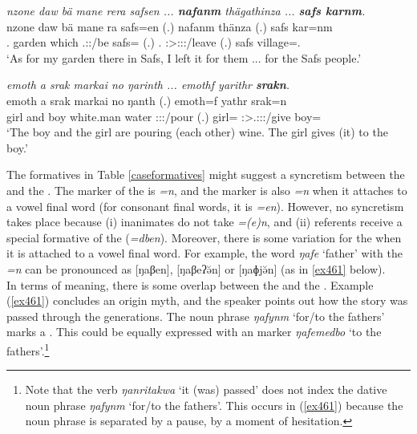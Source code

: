 \begin{exe}
	\ex \emph{nzone daw bä mane rera safsen ... \textbf{nafanm} thägathinza ... \textbf{safs karnm}.}\\
	\gll nzone daw bä mane ra safs=en (.) nafanm thänza (.) safs kar=nm\\
	\Fsg.\Poss{} garden \Med{} which \Tsg.\F:\Pst:\Ipfv/be safs=\Loc{} (.) \Tnsg.\Poss{} \Sg:\Sbj>\Stpl:\Io:\Pst:\Ipfv/leave (.) safs village=\Dat.\Nsg{}\\
	\trans `As for my garden there in Safs, I left it for them ... for the Safs people.'
	\label{ex460}
\end{exe}
\begin{exe}
	\ex \emph{emoth a srak markai no ŋarinth ... emothf yarithr \textbf{srakn}.}\\
	\gll emoth a srak markai no ŋanth (.) emoth=f yathr srak=n\\
	girl and boy {white.man} water \Stdu:\Sbj:\Nonpast:\Ipfv/pour (.) girl=\Erg{} \Stsg:\Sbj>\Tsg.\Masc:\Io:\Nonpast:\Ipfv/give boy=\Dat\\ 
	\trans `The boy and the girl are pouring (each other) wine. The girl gives (it) to the boy.'
	\label{ex462}
\end{exe}
	
The formatives in Table \ref{caseformatives} might suggest a syncretism between the   and the  . The  marker of the  is \emph{=n}, and the  marker is also \emph{=n} when it attaches to a vowel final word (for consonant final words, it is \emph{=en}). However, no syncretism takes place because (i) inanimates do not take  \emph{=(e)n}, and (ii)  referents receive a special formative of the   (\emph{=dben}). Moreover, there is some variation for the  when it is attached to a vowel final word. For example, the word \emph{ŋafe} `father' with the  \emph{=n} can be pronounced as [ŋaβen], [ŋaβeʔə̆n] or [ŋaɸjə̆n] (as in \ref{ex461} below).\\ 

In terms of meaning, there is some overlap between the  and the  . Example (\ref{ex461}) concludes an origin myth, and the speaker points out how the story was passed through the generations. The noun phrase \emph{ŋafynm} `for/to the fathers' marks a . This could be equally expressed with an   marker \emph{ŋafemedbo} `to the fathers'.\footnote{Note that the verb \emph{ŋanritakwa} `it (was) passed' does not index the dative noun phrase \emph{ŋafynm} `for/to the fathers'. This occurs in (\ref{ex461}) because the noun phrase is separated by a pause, by a moment of hesitation.}

